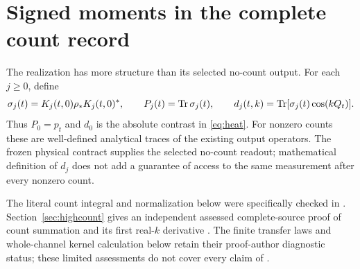 \section{Signed moments in the complete count record}\label{sec:count}

The realization has more structure than its selected no-count output.
For each $j\ge0$, define
\begin{equation}\label{eq:countdef}
 \sigma_j(t)=K_j(t,0)\rho_*K_j(t,0)^*,\qquad
 P_j(t)=\operatorname{Tr}\sigma_j(t),\qquad
 d_j(t,k)=\operatorname{Tr}[\sigma_j(t)\cos(kQ_t)].
\end{equation}
Thus $P_0=p_t$ and $d_0$ is the absolute contrast in \eqref{eq:heat}.
For nonzero counts these are well-defined analytical traces of the existing
output operators. The frozen physical contract supplies the selected
no-count readout; mathematical definition of $d_j$ does not add a guarantee
of access to the same measurement after every nonzero count.

The literal count integral and normalization below were specifically
checked in \cite{TNDHighCountReview}. Section~\ref{sec:highcount} gives an
independent assessed complete-source proof of count summation and its first
real-$k$ derivative \cite{TNDCountTailReview}. The finite transfer laws and
whole-channel kernel calculation below retain their proof-author
diagnostic status; these limited assessments do not cover every claim of
\cite{TNDDirectCollision}.

